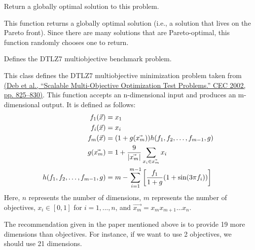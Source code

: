 \documentclass[letterpaper,10pt,english]{sphinxmanual}
\begin{document}
\begin{fulllineitems}
\begin{fulllineitems}
\label{reference:inspyred.benchmarks.DTLZ6.global_optimum}
Return a globally optimal solution to this problem.

This function returns a globally optimal solution (i.e., a 
solution that lives on the Pareto front). Since there are many
solutions that are Pareto-optimal, this function randomly 
chooses one to return.

\end{fulllineitems}


\end{fulllineitems}


\begin{fulllineitems}
\label{reference:inspyred.benchmarks.DTLZ7}
Defines the DTLZ7 multiobjective benchmark problem.

This class defines the DTLZ7 multiobjective minimization problem
taken from \href{http://www.tik.ee.ethz.ch/sop/download/supplementary/testproblems/dtlz1/index.php}{(Deb et al., ``Scalable Multi-Objective Optimization Test Problems.''
CEC 2002, pp. 825--830)}.
This function accepts an n-dimensional input and produces an m-dimensional output.
It is defined as follows:
\begin{gather}
\begin{split}f_1(\vec{x}) &= x_1 \\
f_i(\vec{x}) &= x_i \\
f_m(\vec{x}) &= (1 + g(\vec{x_m}))h(f_1, f_2, \dots, f_{m-1}, g) \\
g(\vec{x_m}) &= 1 + \frac{9}{|\vec{x_m}|}\sum_{x_i \in \vec{x_m}}x_i \\
h(f_1, f_2, \dots, f_{m-1}, g) &= m - \sum_{i=1}^{m-1}\left[\frac{f_1}{1+g}(1 + \sin(3\pi f_i))\right] \\\end{split}\notag
\end{gather}
Here, $n$ represents the number of dimensions, $m$ represents the
number of objectives, $x_i \in [0, 1]$ for $i=1,...,n$, and 
$\vec{x_m} = x_m x_{m+1} \dots x_{n}.$

The recommendation given in the paper mentioned above is to provide 19 more
dimensions than objectives. For instance, if we want to use 2 objectives, we
should use 21 dimensions.
\begin{figure}[htbp]
\centering
\capstart


\end{figure}
\end{fulllineitems}
\end{document}
